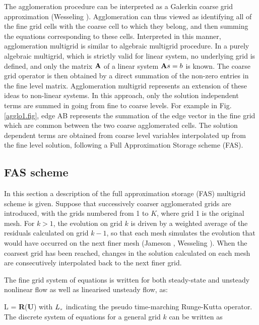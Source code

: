  The agglomeration procedure can be interpreted as a Galerkin coarse grid
 approximation (Wesseling ). Agglomeration can thus
 viewed as identifying all of the fine grid cells with the coarse cell to
 which they belong, and then summing the equations corresponding to these cells.
 Interpreted in this manner, agglomeration multigrid is similar to
 algebraic multigrid procedure. In a purely algebraic multigrid, which is
 strictly valid for linear system, no underlying
 grid is defined, and only the matrix ${\bf A}$ of a linear system
 ${\bf A}s = b$ is known. The coarse grid operator is then obtained by a direct
 summation of the non-zero entries in the fine level matrix. Agglomeration
 multigrid represents an extension of these ideas to non-linear systems.
 In this approach, only the solution independent terms are summed in going
 from fine to coarse levels. For example in Fig. \ref{agglo1.fig}, edge
 AB represents the summation of the edge vector in the fine grid
 which are common between the two coarse agglomerated cells.
 The solution dependent terms are obtained from coarse level variables
 interpolated up from the fine level solution, following a Full
 Approximation Storage scheme (FAS).
%
%
%
\subsection{FAS scheme}
%
 In this section a description of the full approximation storage (FAS) multigrid
 scheme is given.
 Suppose that successively coarser agglomerated grids are introduced, with the
 grids numbered from 1 to $K$, where grid 1 is the original mesh.
 For $k > 1$, the evolution on grid $k$ is driven by a weighted average of
 the residuals calculated on grid $k-1$, so that each mesh simulates the
 evolution that would have occurred on the next finer mesh
 (Jameson , Wesseling ).
 When the coarsest grid has been reached, changes in the solution calculated
 on each mesh are consecutively interpolated back to the next finer grid.

 The fine grid system of equations is written for both steady-state
 and unsteady nonlinear flow as well as linearised unsteady flow, as:

%
\beq
  \left[{\bf P}\right]L\sm{\tau}  = {\bf R}\left({\bf U}\right)
  \label{fine_grid.eq}
\eeq
%
 with $L_{\mbox{\tiny $\tau$}}$ indicating the pseudo time-marching Runge-Kutta operator.
 The discrete system of equations for a general grid $k$ can be written as

